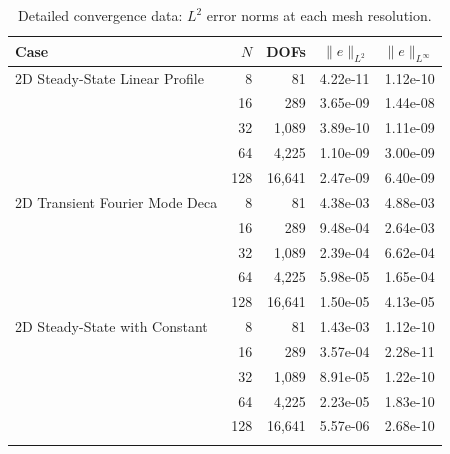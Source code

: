 \begin{table}[htbp]
\centering
\caption{Detailed convergence data: $L^2$ error norms at each mesh resolution.}
\label{tab:vv-detail}
\begin{tabular}{lrrrr}
\toprule
Case & $N$ & DOFs & $\|e\|_{L^2}$ & $\|e\|_{L^\infty}$ \\
\midrule
  2D Steady-State Linear Profile & 8 & 81 & 4.22e-11 & 1.12e-10 \\
   & 16 & 289 & 3.65e-09 & 1.44e-08 \\
   & 32 & 1,089 & 3.89e-10 & 1.11e-09 \\
   & 64 & 4,225 & 1.10e-09 & 3.00e-09 \\
   & 128 & 16,641 & 2.47e-09 & 6.40e-09 \\
\addlinespace
  2D Transient Fourier Mode Deca & 8 & 81 & 4.38e-03 & 4.88e-03 \\
   & 16 & 289 & 9.48e-04 & 2.64e-03 \\
   & 32 & 1,089 & 2.39e-04 & 6.62e-04 \\
   & 64 & 4,225 & 5.98e-05 & 1.65e-04 \\
   & 128 & 16,641 & 1.50e-05 & 4.13e-05 \\
\addlinespace
  2D Steady-State with Constant  & 8 & 81 & 1.43e-03 & 1.12e-10 \\
   & 16 & 289 & 3.57e-04 & 2.28e-11 \\
   & 32 & 1,089 & 8.91e-05 & 1.22e-10 \\
   & 64 & 4,225 & 2.23e-05 & 1.83e-10 \\
   & 128 & 16,641 & 5.57e-06 & 2.68e-10 \\
\addlinespace
\bottomrule
\end{tabular}
\end{table}